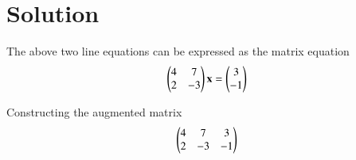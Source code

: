 \documentclass[journal,12pt,twocolumn]{IEEEtran}
\begin{document}
    \section{Solution}
    The above two line equations can be expressed as the matrix equation
    \begin{align}
    \begin{pmatrix}4 & 7\\2 & -3 \end{pmatrix}{\mathbf{x}} = \begin{pmatrix}3\\-1 \end{pmatrix}
    \end{align}
    \begin{flushleft}
    Constructing the augmented matrix \\

    \begin{align}
    \begin{pmatrix}4 & 7 & 3 \\ 
        2 & -3 & -1 \end{pmatrix}
    \end{align}


\end{flushleft}
\end{document}
